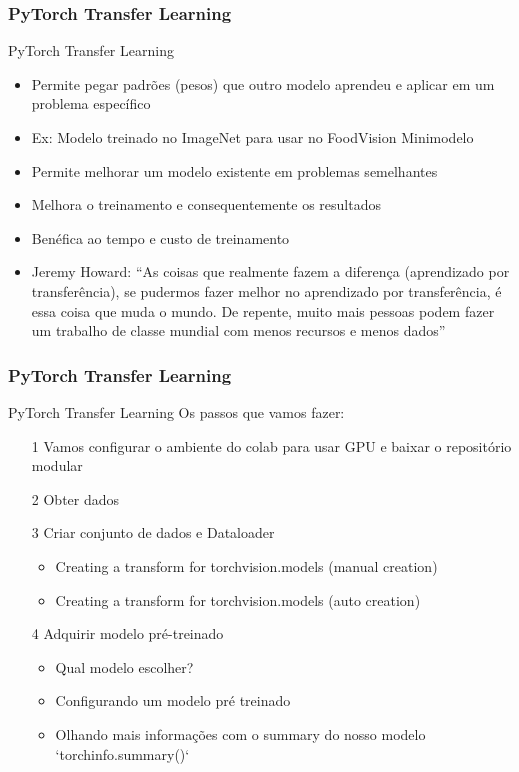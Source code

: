 \documentclass{beamer}
\begin{document}
\begin{frame}
	\frametitle{PyTorch Transfer Learning}
	\begin{block}{PyTorch Transfer Learning}
		\begin{itemize}
			\item Permite pegar padrões (pesos) que outro modelo aprendeu e aplicar em um problema específico
			\item Ex: Modelo treinado no ImageNet para usar no FoodVision Minimodelo
			\item Permite melhorar um modelo existente em problemas semelhantes
			\item Melhora o treinamento e consequentemente os resultados
			\item Benéfica ao tempo e custo de treinamento
			\item Jeremy Howard: ``As coisas que realmente fazem a diferença (aprendizado por transferência), se pudermos fazer melhor no aprendizado por transferência, é essa coisa que muda o mundo. De repente, muito mais pessoas podem fazer um trabalho de classe mundial com menos recursos e menos dados''
		\end{itemize}
	\end{block}
\end{frame}    
\begin{frame}
	\frametitle{PyTorch Transfer Learning}
	\begin{block}{PyTorch Transfer Learning}
		Os passos que vamos fazer:
		\begin{itemize}
			\item[1] Vamos configurar o ambiente do colab para usar GPU e baixar o repositório modular
			\item[2] Obter dados
			\item[3] Criar conjunto de dados e Dataloader
			\begin{itemize}
				\item Creating a transform for torchvision.models (manual creation)
				\item Creating a transform for torchvision.models (auto creation)
			\end{itemize}
			\item[4] Adquirir modelo pré-treinado
			\begin{itemize}
				\item Qual modelo escolher?
				\item Configurando um modelo pré treinado
				\item Olhando mais informações com o summary do nosso modelo `torchinfo.summary()`
			\end{itemize}
		\end{itemize}
	\end{block}
\end{frame}    
\end{document}
